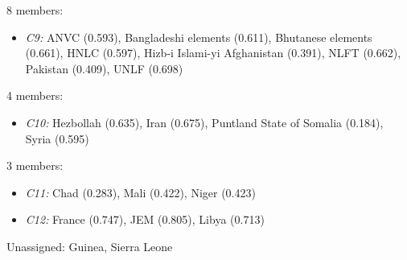 8 members:
\begin{itemize}[noitemsep, topsep=0pt]
    \item \textit{C9:} ANVC (0.593), Bangladeshi elements (0.611), Bhutanese elements (0.661), HNLC (0.597), Hizb-i Islami-yi Afghanistan (0.391), NLFT (0.662), Pakistan (0.409), UNLF (0.698)
\end{itemize}
4 members:
\begin{itemize}[noitemsep, topsep=0pt]
    \item \textit{C10:} Hezbollah (0.635), Iran (0.675), Puntland State of Somalia (0.184), Syria (0.595)
\end{itemize}
3 members:
\begin{itemize}[noitemsep, topsep=0pt]
    \item \textit{C11:} Chad (0.283), Mali (0.422), Niger (0.423)
    \item \textit{C12:} France (0.747), JEM (0.805), Libya (0.713)
\end{itemize}
Unassigned: Guinea, Sierra Leone\\

